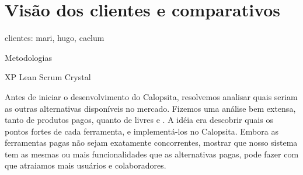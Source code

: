 \section{Visão dos clientes e comparativos}

clientes: mari, hugo, caelum

Metodologias

XP
Lean
Scrum
Crystal


Antes de iniciar o desenvolvimento do Calopsita, resolvemos analisar quais seriam as outras alternativas disponíveis no mercado. Fizemos uma análise bem extensa, tanto de produtos pagos, quanto de livres e \opensource. A idéia era descobrir quais os pontos fortes de cada ferramenta, e implementá-los no Calopsita. Embora as ferramentas pagas não sejam exatamente concorrentes, mostrar que nosso sistema tem as mesmas ou mais funcionalidades que as alternativas pagas, pode fazer com que atraiamos mais usuários e colaboradores.

